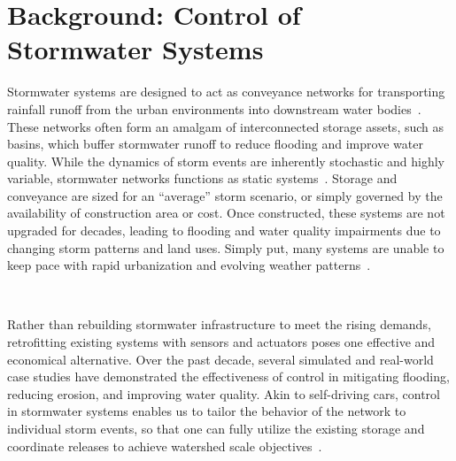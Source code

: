 \section{Background: Control of Stormwater Systems}\label{sec:ctrlstrmsystems}

Stormwater systems are designed to act as conveyance networks for transporting rainfall runoff from the urban environments into downstream water bodies~\cite{national2009urban, rossman2010storm}.
These networks often form an amalgam of interconnected storage assets, such as basins, which buffer stormwater runoff to reduce flooding and improve water quality.
While the dynamics of storm events are inherently stochastic and highly variable, stormwater networks functions as static systems~\cite{kerkez2016}.
Storage and conveyance are sized for an ``average'' storm scenario, or simply governed by the availability of construction area or cost.
Once constructed, these systems are not upgraded for decades, leading to flooding and water quality impairments due to changing storm patterns and land uses. 
Simply put, many systems are unable to keep pace with rapid urbanization and evolving weather patterns~\cite{kerkez2016}.


\

Rather than rebuilding stormwater infrastructure to meet the rising demands, retrofitting existing systems with sensors and actuators poses one effective and economical alternative\cite{kerkez2016}.
Over the past decade, several simulated\cite{Mullapudi_Lewis_Gruden_Kerkez_2020, Troutman_2020, lund2018, Wong_Kerkez_2018,Ocampo-Martinez_2015,vezzaro2014} and real-world case studies\cite{Mullapudi_Bartos_Wong_Kerkez_2018} have demonstrated the effectiveness of control in mitigating flooding, reducing erosion, and improving water quality.
Akin to self-driving cars, control in stormwater systems enables us to tailor the behavior of the network to individual storm events, so that one can fully utilize the existing storage and coordinate releases to achieve watershed scale objectives~\cite{kerkez2016}.

